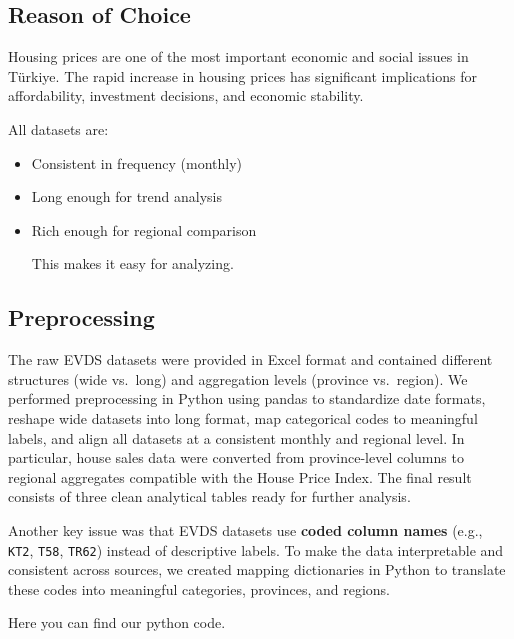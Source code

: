 \documentclass[
  11pt,
  a4paper,
  DIV=11,
  numbers=noendperiod]{scrartcl}
\begin{document}
\subsection{Reason of Choice}\label{reason-of-choice}

Housing prices are one of the most important economic and social issues
in Türkiye. The rapid increase in housing prices has significant
implications for affordability, investment decisions, and economic
stability.

All datasets are:

\begin{itemize}
\item
  Consistent in frequency (monthly)
\item
  Long enough for trend analysis
\item
  Rich enough for regional comparison

  This makes it easy for analyzing.
\end{itemize}

\subsection{Preprocessing}\label{preprocessing}

The raw EVDS datasets were provided in Excel format and contained
different structures (wide vs.~long) and aggregation levels (province
vs.~region). We performed preprocessing in Python using pandas to
standardize date formats, reshape wide datasets into long format, map
categorical codes to meaningful labels, and align all datasets at a
consistent monthly and regional level. In particular, house sales data
were converted from province-level columns to regional aggregates
compatible with the House Price Index. The final result consists of
three clean analytical tables ready for further analysis.

Another key issue was that EVDS datasets use \textbf{coded column names}
(e.g., \texttt{KT2}, \texttt{T58}, \texttt{TR62}) instead of descriptive
labels. To make the data interpretable and consistent across sources, we
created mapping dictionaries in Python to translate these codes into
meaningful categories, provinces, and regions.

Here you can find our python code.\\
\strut \\
\end{document}
